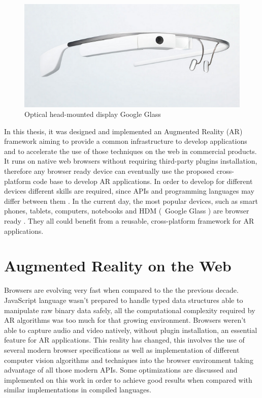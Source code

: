 \begin{figure}[!htb]
  \centering
  \includegraphics[width=350pt]{chapters/basic_concepts/google_glass.png}
  \caption{Optical head-mounted display Google Glass \cite{Glass2013}}
  \label{figure:google_glass}
\end{figure}

In this thesis, it was designed and implemented an Augmented Reality (AR) framework aiming to provide a common infrastructure to develop applications and to accelerate the use of those techniques on the web in commercial products. It runs on native web browsers without requiring third-party plugins installation, therefore any browser ready device can eventually use the proposed cross-platform code base to develop AR applications. In order to develop for different devices different skills are required, since APIs and programming languages may differ between them \cite{MDN2013,International2009}. In the current day, the most popular devices, such as smart phones, tablets, computers, notebooks and HDM (\ie\ Google Glass \cite{Glass2013}) \cite{Benford1998} are browser ready \cite{Hickson2013}. They all could benefit from a reusable, cross-platform framework for AR applications.


\section{Augmented Reality on the Web} %
\label{sec:basic_concepts:augmented_reality_on_the_web}

Browsers are evolving very fast when compared to the the previous decade. JavaScript language wasn't prepared to handle typed data structures able to manipulate raw binary data safely, all the computational complexity required by AR algorithms was too much for that growing environment. Browsers weren't able to capture audio and video natively, without plugin installation, an essential feature for AR applications. This reality has changed, this involves the use of several modern browser specifications as well as implementation of different computer vision algorithms and techniques into the browser environment taking advantage of all those modern APIs. Some optimizations are discussed and implemented on this work in order to achieve good results when compared with similar implementations in compiled languages.

